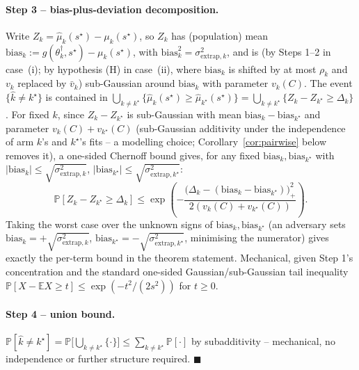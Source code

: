 \paragraph{Step 3 -- bias-plus-deviation decomposition.}
\label{sec:theorem1-step3}
Write $Z_k = \hat\mu_k(s^\star) - \mu_k(s^\star)$, so $Z_k$ has (population) mean
$\mathrm{bias}_k := g(\theta_k^\dagger, s^\star) - \mu_k(s^\star)$, with
$\mathrm{bias}_k^2 = \sigma^2_{\mathrm{extrap}, k}$, and is (by Steps 1--2 in case~(i); by hypothesis (H) in case~(ii), where
$\mathrm{bias}_k$ is shifted by at most $\rho_k$ and $v_k$ replaced by $\bar v_k$)
sub-Gaussian around $\mathrm{bias}_k$ with parameter $v_k(C)$. The event
$\{\hat{k} \ne k^\star\}$ is contained in $\bigcup_{k \ne k^\star}
\{\hat\mu_k(s^\star) \ge \hat\mu_{k^\star}(s^\star)\}
= \bigcup_{k \ne k^\star} \{Z_k - Z_{k^\star} \ge \Delta_k\}$. For fixed $k$, since
$Z_k - Z_{k^\star}$ is sub-Gaussian with mean $\mathrm{bias}_k - \mathrm{bias}_{k^\star}$
and parameter $v_k(C) + v_{k^\star}(C)$ (sub-Gaussian additivity under the independence
of arm $k$'s and $k^\star$'s fits -- a modelling choice; Corollary~\ref{cor:pairwise}
below removes it), a one-sided Chernoff bound gives, for any fixed
$\mathrm{bias}_k, \mathrm{bias}_{k^\star}$ with $|\mathrm{bias}_k| \le
\sqrt{\sigma^2_{\mathrm{extrap},k}}$, $|\mathrm{bias}_{k^\star}| \le
\sqrt{\sigma^2_{\mathrm{extrap},k^\star}}$:
\[
  \mathbb{P}[Z_k - Z_{k^\star} \ge \Delta_k]
  \le \exp\!\left(
    - \frac{\big(\Delta_k - (\mathrm{bias}_k - \mathrm{bias}_{k^\star})\big)_+^2}
    {2(v_k(C) + v_{k^\star}(C))} \right).
\]
Taking the worst case over the unknown signs of $\mathrm{bias}_k, \mathrm{bias}_{k^\star}$
(an adversary sets $\mathrm{bias}_k = +\sqrt{\sigma^2_{\mathrm{extrap},k}}$,
$\mathrm{bias}_{k^\star} = -\sqrt{\sigma^2_{\mathrm{extrap},k^\star}}$, minimising the
numerator) gives exactly the per-term bound in the theorem statement. Mechanical, given
Step 1's concentration and the standard one-sided Gaussian/sub-Gaussian tail inequality
$\mathbb{P}[X - \mathbb{E}X \ge t] \le \exp(-t^2/(2s^2))$ for $t \ge 0$.

\paragraph{Step 4 -- union bound.}
\label{sec:theorem1-step4}
$\mathbb{P}[\hat{k}\ne k^\star] = \mathbb{P}\big[\bigcup_{k\ne k^\star}\{\cdot\}\big]
\le \sum_{k \ne k^\star} \mathbb{P}[\cdot]$ by subadditivity -- mechanical, no
independence or further structure required. $\blacksquare$

